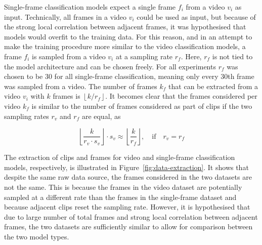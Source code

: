 \documentclass[a4paper]{article}
\begin{document}
  Single-frame classification models expect a single frame $f_i$ from a video
  $v_i$ as input. Technically, all frames in a video $v_i$ could be used as
  input, but because of the strong local correlation between adjacent frames, it
  was hypothesised that models would overfit to the training data. For this
  reason, and in an attempt to make the training procedure more similar to the
  video classification models, a frame $f_i$ is sampled from a video $v_i$ at a
  sampling rate $r_f$. Here, $r_f$ is not tied to the model architecture and can
  be chosen freely. For all experiments $r_f$ was chosen to be $30$ for all
  single-frame classification, meaning only every 30th frame was sampled from a
  video. The number of frames $k_f$ that can be extracted from a video $v_i$
  with $k$ frames is $\left\lfloor k / r_f \right\rfloor$. It becomes clear that
  the frames considered per video $k_f$ is similar to the number of frames
  considered as part of clips if the two sampling rates $r_v$ and $r_f$ are
  equal, as

  \[
    \left\lfloor \frac{k}{r_v \cdot s_v} \right\rfloor \cdot s_v \approx
    \left\lfloor \frac{k}{r_f} \right\rfloor, \quad \text{if} \quad r_v = r_f
  \]

  The extraction of clips and frames for video and single-frame classification
  models, respectively, is illustrated in Figure~\ref{fig:data-extraction}. It
  shows that despite the same raw data source, the frames considered in the two
  datasets are not the same. This is because the frames in the video dataset are
  potentially sampled at a different rate than the frames in the single-frame
  dataset and because adjacent clips reset the sampling rate. However, it is
  hypothesised that due to large number of total frames and strong local
  correlation between adjacent frames, the two datasets are sufficiently similar
  to allow for comparison between the two model types.
\end{document}
